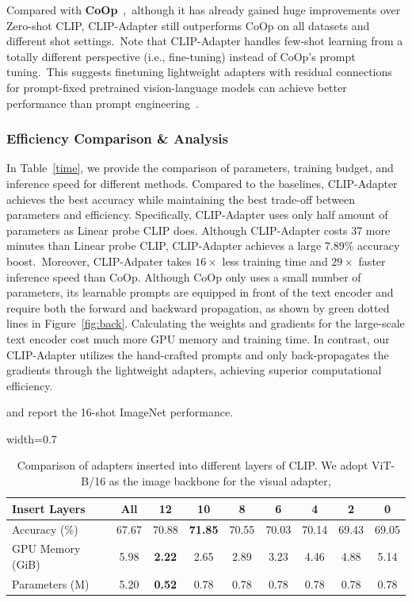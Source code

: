 \documentclass[default,iicol]{sn-jnl}%
\theoremstyle{thmstyleone}%
\theoremstyle{thmstyletwo}%
\theoremstyle{thmstylethree}%
\begin{document}
Compared with \textbf{CoOp}~\cite{zhou2021coop},~although it has already gained huge improvements over Zero-shot CLIP, CLIP-Adapter still outperforms CoOp on all datasets and different shot settings.~Note that CLIP-Adapter handles few-shot learning from a totally different perspective (i.e., fine-tuning) instead of CoOp's prompt tuning.~This suggests finetuning lightweight adapters with residual connections for prompt-fixed pretrained vision-language models can achieve better performance than prompt engineering~\cite{liu2023pre}.


\subsubsection{Efficiency Comparison \& Analysis}
\label{sec:efficiency}
In Table~\ref{time}, we provide the comparison of parameters, training budget, and inference speed for different methods. Compared to the baselines, CLIP-Adapter achieves the best accuracy while maintaining the best trade-off between parameters and efficiency. Specifically, CLIP-Adapter uses only half amount of parameters as Linear probe CLIP does. Although CLIP-Adapter costs 37 more minutes than Linear probe CLIP, CLIP-Adapter achieves a large 7.89\% accuracy boost.~Moreover, CLIP-Adpater takes $16\times$ less training time and $29\times$ faster inference speed than CoOp. Although CoOp only uses a small number of parameters, its learnable prompts are equipped in front of the text encoder and require both the forward and backward propagation, as shown by green dotted lines in Figure~\ref{fig:back}. Calculating the weights and gradients for the large-scale text encoder cost much more GPU memory and training time. In contrast, our CLIP-Adapter utilizes the hand-crafted prompts and only back-propagates the gradients through the lightweight adapters, achieving superior computational efficiency.

\begin{table}[ht!]
\centering
\caption{Comparison of adapters inserted into different layers of CLIP. We adopt ViT-B/16 as the image backbone for the visual adapter,} and report the 16-shot ImageNet performance.
\vspace*{5pt}
\begin{adjustbox}{width=0.7\linewidth}
	\begin{tabular}{lcccccccc}
	\toprule
		Insert Layers & All    & 12  &  10  &  8 & 6 & 4 & 2 &0 \\
		\midrule
		Accuracy (\%)  & 67.67		&70.88		&\textbf{71.85}	&70.55		&70.03		&70.14	   	&69.43		&69.05 \\
		GPU Memory (GiB)  & 5.98	 &	\textbf{2.22}		 &2.65	 &	2.89	 &	3.23		 &4.46		 &4.88		 &5.14 \\
            Parameters (M)  & 5.20	&	\textbf{0.52}		&0.78		&0.78	&	0.78		&0.78		&0.78		&0.78 \\
	\bottomrule
	\end{tabular}
\end{adjustbox}
\label{tab:insert}
\end{table}
\end{document}
